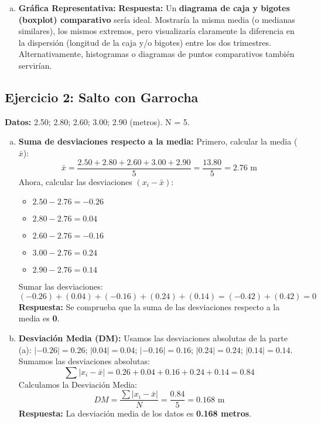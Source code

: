 \documentclass[10pt, a4paper]{article}
\newcommand{\mean}[1]{\ensuremath{\bar{#1}}} %
\begin{document}
\begin{enumerate}[a.]
    \item \textbf{Gráfica Representativa:}
    \textbf{Respuesta:} Un \textbf{diagrama de caja y bigotes (boxplot) comparativo} sería ideal. Mostraría la misma media (o medianas similares), los mismos extremos, pero visualizaría claramente la diferencia en la dispersión (longitud de la caja y/o bigotes) entre los dos trimestres. Alternativamente, histogramas o diagramas de puntos comparativos también servirían.

\end{enumerate}

\subsection*{Ejercicio 2: Salto con Garrocha}
\textbf{Datos:} \num{2,50}; \num{2,80}; \num{2,60}; \num{3,00}; \num{2,90} (metros). N = 5.

\begin{enumerate}[a.]
    \item \textbf{Suma de desviaciones respecto a la media:}
    Primero, calcular la media (\mean{x}):
    \[ \mean{x} = \frac{\num{2,50} + \num{2,80} + \num{2,60} + \num{3,00} + \num{2,90}}{5} = \frac{\num{13,80}}{5} = \num{2,76} \text{ m} \]
    Ahora, calcular las desviaciones $(x_i - \mean{x})$:
    \begin{itemize}[nosep]
        \item $\num{2,50} - \num{2,76} = \num{-0,26}$
        \item $\num{2,80} - \num{2,76} = \num{+0,04}$
        \item $\num{2,60} - \num{2,76} = \num{-0,16}$
        \item $\num{3,00} - \num{2,76} = \num{+0,24}$
        \item $\num{2,90} - \num{2,76} = \num{+0,14}$
    \end{itemize}
    Sumar las desviaciones:
    \[ (\num{-0,26}) + (\num{+0,04}) + (\num{-0,16}) + (\num{+0,24}) + (\num{+0,14}) = (\num{-0,42}) + (\num{+0,42}) = 0 \]
    \textbf{Respuesta:} Se comprueba que la suma de las desviaciones respecto a la media es \textbf{0}.

    \item \textbf{Desviación Media (DM):}
    Usamos las desviaciones absolutas de la parte (a): $|\num{-0,26}|=\num{0,26}$; $|\num{+0,04}|=\num{0,04}$; $|\num{-0,16}|=\num{0,16}$; $|\num{+0,24}|=\num{0,24}$; $|\num{+0,14}|=\num{0,14}$.
    Sumamos las desviaciones absolutas:
    \[ \sum |x_i - \mean{x}| = \num{0,26} + \num{0,04} + \num{0,16} + \num{0,24} + \num{0,14} = \num{0,84} \]
    Calculamos la Desviación Media:
    \[ DM = \frac{\sum |x_i - \mean{x}|}{N} = \frac{\num{0,84}}{5} = \num{0,168} \text{ m} \]
    \textbf{Respuesta:} La desviación media de los datos es \textbf{\num{0,168} metros}.
\end{enumerate}
\end{document}
